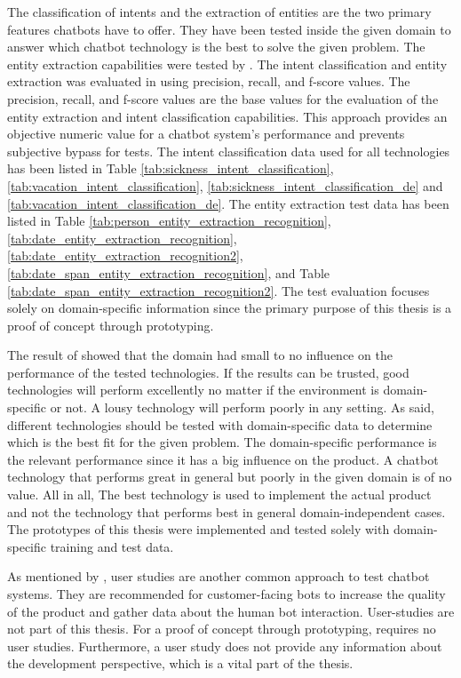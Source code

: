 The classification of intents and the extraction of entities are the two primary features chatbots have to offer.
They have been tested inside the given domain to answer which chatbot technology is the best to solve the given problem.
The entity extraction capabilities were tested by \citet{geyer2016named}.
The intent classification and entity extraction was evaluated in \citet{braunEvaluatingNLU} using precision, recall, and f-score values.
The precision, recall, and f-score values are the base values for the evaluation of the entity extraction and intent classification capabilities.
This approach provides an objective numeric value for a chatbot system's performance and prevents subjective bypass for tests.
The intent classification data used for all technologies has been listed in 
Table \ref{tab:sickness_intent_classification},
\ref{tab:vacation_intent_classification}, \ref{tab:sickness_intent_classification_de} and \ref{tab:vacation_intent_classification_de}.
The entity extraction test data has been listed in Table \ref{tab:person_entity_extraction_recognition}, 
\ref{tab:date_entity_extraction_recognition}, \ref{tab:date_entity_extraction_recognition2}, 
\ref{tab:date_span_entity_extraction_recognition}, and Table \ref{tab:date_span_entity_extraction_recognition2}.
The test evaluation focuses solely on domain-specific information since the primary purpose of this thesis is a proof of concept through prototyping.

The result of \citet{braunEvaluatingNLU} showed that the domain had small to no influence on the performance of the tested technologies.
If the results can be trusted, good technologies will perform excellently no matter if the environment is domain-specific or not.
A lousy technology will perform poorly in any setting.
As \citet{braunEvaluatingNLU} said, different technologies should be tested with domain-specific data to determine which is the best fit for the given problem.
The domain-specific performance is the relevant performance since it has a big influence on the product.
A chatbot technology that performs great in general but poorly in the given domain is of no value.
All in all, The best technology is used to implement the actual product and not the technology that performs best in general domain-independent cases.
The prototypes of this thesis were implemented and tested solely with domain-specific training and test data.

As mentioned by \citet{evaluateChatbotsShawar2007}, user studies are another common approach to test chatbot systems.
They are recommended for customer-facing bots to increase the quality of the product and gather data about the human bot interaction.
User-studies are not part of this thesis.
For a proof of concept through prototyping, requires no user studies.
Furthermore, a user study does not provide any information about the development perspective, which is a vital part of the thesis.

